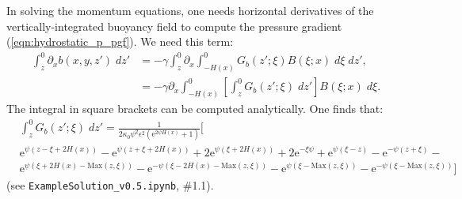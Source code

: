 \documentclass[10pt]{amsart}
\begin{document}
In solving the momentum equations, one needs horizontal derivatives of the vertically-integrated buoyancy field to compute the pressure gradient (\ref{eqn:hydrostatic_p_pgf}).
We need this term:
\begin{align}
 \int_{z}^{0} \partial_x b(x,y,z') \; dz' & = - \gamma \int_{z}^{0} \partial_x  \int_{-H(x)}^{0} G_b(z'; \xi) B(\xi; x) \; d \xi\; dz' , \nonumber \\
 & = - \gamma  \partial_x  \int_{-H(x)}^{0} \left[ \int_{z}^{0} G_b(z'; \xi) \; dz' \right] B(\xi; x) \; d \xi. \nonumber
\end{align}
The integral in square brackets can be computed analytically.
One finds that:
\begin{align}
& \int_{z}^{0} G_b(z'; \xi) \; dz'   =  \frac{1}{ 2 \kappa_0  \psi^{2} \epsilon^{2} \left( \mathrm{e}^{2 \psi H\left( x \right)} + 1 \right) }\bigg[ \nonumber \\
& \mathrm{e}^{\psi \left( z  - \xi + 2  H(x)\right)} -
 \mathrm{e}^{\psi \left( z + \xi + 2 H(x)\right)} +
2 \mathrm{e}^{\psi \left( \xi + 2  H(x) \right) } + 
2 \mathrm{e}^{ - \xi \psi} +  
\mathrm{e}^{  \psi \left(  \xi - z \right)} - 
\mathrm{e}^{ - \psi \left( z + \xi \right)} - \nonumber \\
& \mathrm{e}^{ \psi \left( \xi + 2  H(x) -  \mathrm{Max}\left( z, \xi \right)\right)} - 
\mathrm{e}^{ - \psi \left( \xi - 2  H(x) -  \mathrm{Max}\left( z, \xi \right) \right)} -
\mathrm{e}^{ \psi \left( \xi  -  \mathrm{Max}\left( z, \xi \right) \right)} - 
 \mathrm{e}^{ - \psi \left( \xi - \mathrm{Max}\left( z, \xi \right) \right)} 
\bigg] \nonumber 
\end{align}
(see \texttt{ExampleSolution\_v0.5.ipynb}, \#1.1).
\end{document}
